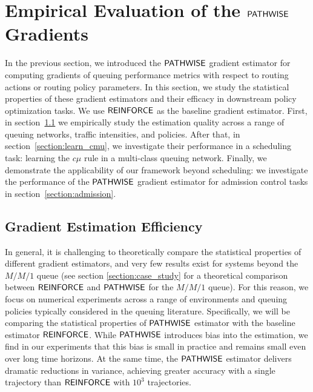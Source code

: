 

\section{Empirical Evaluation of the $\mathsf{PATHWISE}$ Gradients}
\label{section:gradient_eval}

In the previous section, we introduced the $\mathsf{PATHWISE}$ gradient estimator for computing gradients of queuing performance metrics with respect to routing actions or routing policy parameters. In this section, we study the statistical properties of these gradient estimators and their efficacy in downstream policy optimization tasks. We use $\mathsf{REINFORCE}$ as the baseline gradient estimator. First, in section~\ref{sec:gradient_efficiency} we empirically study the estimation quality across a range of queuing networks, traffic intensities, and policies. After that, in section~\ref{section:learn_cmu}, we investigate their performance in a scheduling task: learning the $c\mu$ rule in a multi-class queuing network. Finally, we demonstrate the applicability of our framework beyond scheduling: we investigate the performance of the $\mathsf{PATHWISE}$ gradient estimator for admission control tasks in section~\ref{section:admission}. 


\subsection{Gradient Estimation Efficiency}
\label{sec:gradient_efficiency}
In general, it is challenging to theoretically compare the statistical properties of different gradient estimators, and very few results exist for systems beyond the $M/M/1$ queue (see section \ref{section:case_study} for a theoretical comparison between $\mathsf{REINFORCE}$ and $\mathsf{PATHWISE}$ for the $M/M/1$ queue). For this reason, we focus on numerical experiments across a range of environments and queuing policies typically considered in the queuing literature. Specifically, we will be comparing the statistical properties of 
$\mathsf{PATHWISE}$ estimator with the baseline estimator $\mathsf{REINFORCE}$. While $\mathsf{PATHWISE}$ introduces bias into the estimation, we find in our experiments that this bias is small in practice and remains small even over long time horizons. At the same time, the $\mathsf{PATHWISE}$ estimator delivers dramatic reductions in variance, achieving greater accuracy with a single trajectory than $\mathsf{REINFORCE}$ with $10^3$ trajectories.

